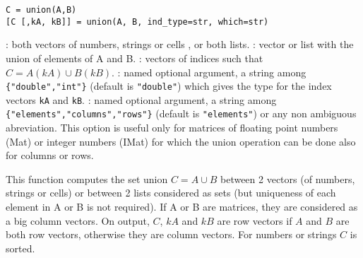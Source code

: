 
\begin{mandesc}
\end{mandesc}

\begin{calling_sequence}
\begin{verbatim}
C = union(A,B)
[C [,kA, kB]] = union(A, B, ind_type=str, which=str)
\end{verbatim}
\end{calling_sequence}
\begin{parameters}
  \begin{varlist}
    : both vectors of numbers, strings or cells , or both lists.
    : vector or list with the union of elements of A and B.
    : vectors of indices such that $C = A(kA) \cup B(kB)$.
    : named optional argument, a string among \verb+{"double","int"}+ (default is \verb+"double"+)
    which gives the type for the index vectors  \verb+kA+ and \verb+kB+. 
    : named optional argument, a string among \verb+{"elements","columns","rows"}+ (default is
    \verb+"elements"+) or any non ambiguous abreviation. This option is useful only for matrices of floating 
       point numbers (Mat) or integer numbers (IMat) for which the union operation can be done also for
       columns or rows.
  \end{varlist}
\end{parameters}

\begin{mandescription}
  This function computes the set union $C = A \cup B$
  between 2 vectors (of numbers, strings or cells) or between 2
  lists considered as sets (but uniqueness of each element in A or B is not
  required). If A or B are matrices, they are considered as a big column vectors.
  On output, $C$, $kA$ and $kB$ are row vectors if  $A$ and $B$ are both row vectors, otherwise they
  are column vectors. For numbers or strings $C$ is sorted.
\end{mandescription}

